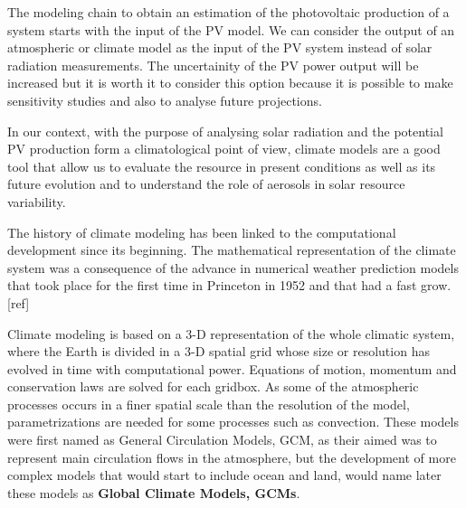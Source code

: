 The modeling chain to obtain an estimation of the photovoltaic production of a system starts with the input of the PV model. We can consider the output of an atmospheric or climate model as the input of the PV system instead of solar radiation measurements. The uncertainity of the PV power output will be increased but it is worth it to consider this option because it is possible to make sensitivity studies and also to analyse future projections.
 

In our context, with the purpose of analysing solar radiation and the potential PV production form a climatological point of view, climate models are a good tool that allow us to evaluate the resource in present conditions as well as its future evolution and to understand the role of aerosols in solar resource variability.

The history of climate modeling has been linked to the computational development since its beginning. The mathematical representation of the climate system was a consequence of the advance in numerical weather prediction models that took place for the first time in Princeton in 1952 and that had a fast grow. [ref]%

Climate modeling is based on a 3-D representation of the whole climatic system, where the Earth is divided  in a 3-D spatial grid whose size or resolution has evolved in time with computational power. Equations of motion, momentum and conservation laws are solved for each gridbox. As some of the atmospheric processes occurs in a finer spatial scale than the resolution of the model, parametrizations are needed for some processes such as convection. These models were first named as General Circulation Models, GCM, as their aimed was to represent main circulation flows in the atmosphere, but the development of more complex models that would start to include ocean and land, would name later these models as \textbf{Global Climate Models, GCMs}. 

